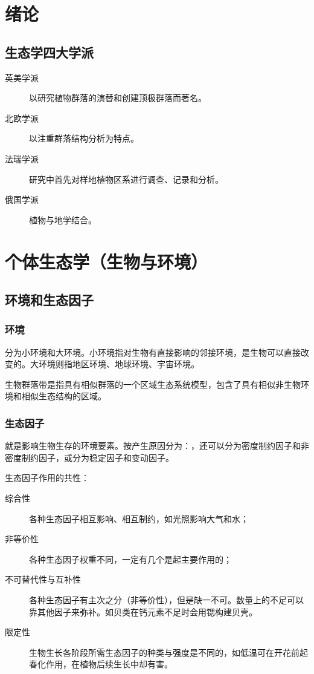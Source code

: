 \section{绪论}

\subsection{生态学四大学派}

\begin{description}
	\item[英美学派] 以研究植物群落的演替和创建顶极群落而著名。
	\item[北欧学派] 以注重群落结构分析为特点。
	\item[法瑞学派] 研究中首先对样地植物区系进行调查、记录和分析。
	\item[俄国学派] 植物与地学结合。
\end{description}


\section{个体生态学（生物与环境）}

\subsection{环境和生态因子}
\subsubsection{环境}

	分为小环境和大环境。小环境指对生物有直接影响的邻接环境，是生物可以直接改变的。大环境则指地区环境、地球环境、宇宙环境。
		
	生物群落带是指具有相似群落的一个区域生态系统模型，包含了具有相似非生物环境和相似生态结构的区域。

\subsubsection{生态因子}

	就是影响生物生存的环境要素。按产生原因分为：，还可以分为密度制约因子和非密度制约因子，或分为稳定因子和变动因子。
	
	生态因子作用的共性：
	
	\begin{description}
		\item[综合性] 各种生态因子相互影响、相互制约，如光照影响大气和水；
		\item[非等价性] 各种生态因子权重不同，一定有几个是起主要作用的；
		\item[不可替代性与互补性] 各种生态因子有主次之分（非等价性），但是缺一不可。数量上的不足可以靠其他因子来弥补。如贝类在钙元素不足时会用锶构建贝壳。
		\item[限定性] 生物生长各阶段所需生态因子的种类与强度是不同的，如低温可在开花前起春化作用，在植物后续生长中却有害。
	\end{description}
	
